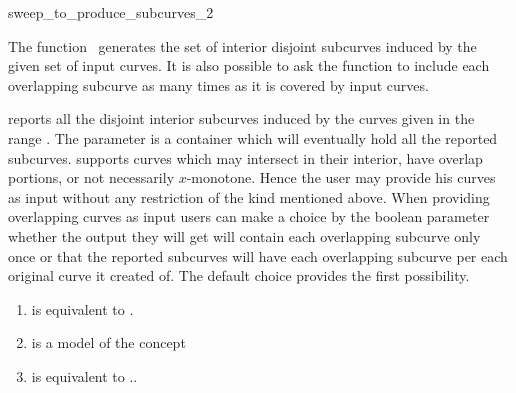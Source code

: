 

\begin{ccRefFunction}{sweep_to_produce_subcurves_2}  %


\ccDefinition

The function \ccRefName\ generates the set of interior disjoint
subcurves induced by the given set of input curves. It is also
possible to ask the function to include each overlapping subcurve
as many times as it is covered by input curves.

\def\ccLongParamLayout{\ccTrue} 

   {reports all the disjoint interior subcurves induced by the curves
   given in the range \ccStyle{[curves_begin, curves_end)}. The
   parameter  is a container which will eventually
   hold all the reported
   subcurves.  supports
   curves which may intersect in their interior, 
   have overlap portions, or not necessarily $x$-monotone. 
   Hence the user may provide his curves as input without any
   restriction of the kind mentioned above. When providing overlapping
   curves as input users can make a choice by the boolean parameter
    whether the output they will get will contain
   each overlapping subcurve only once or that the reported subcurves
   will have each overlapping subcurve per each original curve it
   created of. The default choice provides the first possibility.}

\begin{enumerate}
   \item    {} is equivalent to .
   \item    {} is a model of the  concept
   \item    {} is equivalent to ..
\end{enumerate}


\end{ccRefFunction}
